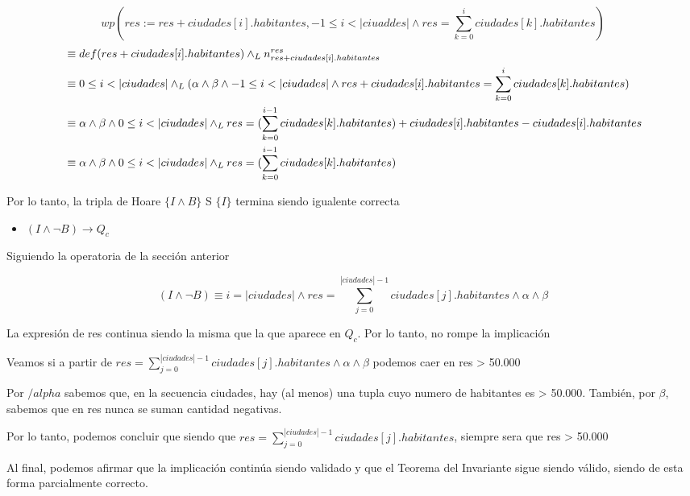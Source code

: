 \documentclass[10pt,a4paper]{article}
\begin{document}
\begin {enumerate}
    $$ wp(res := res + ciudades[i].habitantes, -1 \leq i < |ciuaddes| \land res =  \sum\limits_{k=0}^{i}{ciudades[k].habitantes}) $$
    \begin{align*}
        &\equiv def(res + ciudades[i].habitantes) \land _L n_{res + ciudades[i].habitantes}^{res} \\
        &\equiv 0 \leq i < |ciudades| \land _L (\alpha \land \beta \land -1 \leq i < |ciudades| \land res + ciudades[i].habitantes = \sum\limits_{k=0}^{i}{ciudades[k].habitantes} ) \\
        &\equiv \alpha \land \beta \land  0 \leq i < |ciudades| \land _L res = (\sum\limits_{k=0}^{i - 1}{ciudades[k].habitantes}) + ciudades[i].habitantes - ciudades[i].habitantes \\
        &\equiv \alpha \land \beta \land  0 \leq i < |ciudades| \land _L res = (\sum\limits_{k=0}^{i - 1}{ciudades[k].habitantes})  \\
    \end{align*}


    Por lo tanto, la tripla de Hoare $\{ I \land B \}$ S $ \{ I\}$ termina siendo igualente correcta

    \begin{itemize}
        \item $(I \land \neg B) \to Q_{c}$
    \end{itemize}

    Siguiendo la operatoria de la sección anterior

    $$ (I \land \neg B) \equiv i = |ciudades| \land res = \sum\limits^{|ciudades|- 1}_{j = 0}{ciudades[j].habitantes} \land \alpha \land \beta $$

    La expresión de res continua siendo la misma que la que aparece en $Q_{c}$. Por lo tanto, no rompe la implicación

    Veamos si a partir de $res = \sum\limits^{|ciudades|- 1}_{j = 0}{ciudades[j].habitantes} \land \alpha \land \beta$ podemos caer en res > 50.000

    Por $/alpha$ sabemos que, en la secuencia ciudades, hay (al menos) una tupla cuyo numero de habitantes es > 50.000. También, por $\beta$, sabemos
    que en res nunca se suman cantidad negativas.

    Por lo tanto, podemos concluir que siendo que $res = \sum\limits^{|ciudades|- 1}_{j = 0}{ciudades[j].habitantes}$, siempre sera que res > 50.000
    
    Al final, podemos afirmar que la implicación continúa siendo validado y que el Teorema del Invariante sigue siendo válido, siendo de esta forma parcialmente correcto. 


\end{enumerate}
\end{document}
